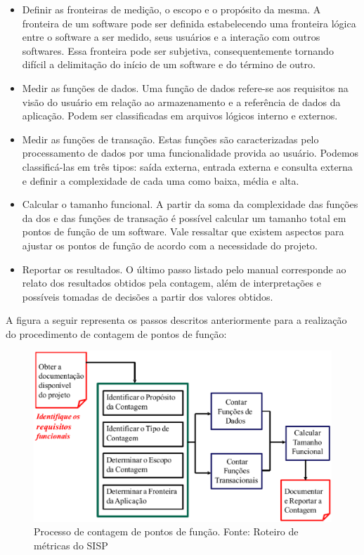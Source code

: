 \begin{itemize}

\item Definir as fronteiras de medição, o escopo e o propósito da mesma. A fronteira de um software pode ser definida estabelecendo uma fronteira lógica entre o software a ser medido, seus usuários e a interação com outros softwares. Essa fronteira pode ser subjetiva, consequentemente tornando difícil a delimitação do início de um software e do término de outro.

\item Medir as funções de dados. Uma função de dados refere-se aos requisitos na visão do usuário em relação ao armazenamento e a referência de dados da aplicação. Podem ser classificadas em arquivos lógicos interno e externos.

\item Medir as funções de transação. Estas funções são caracterizadas pelo processamento de dados por uma funcionalidade provida ao usuário. Podemos classificá-las em três tipos: saída externa, entrada externa e consulta externa e definir a complexidade de cada uma como baixa, média e alta.

\item Calcular o tamanho funcional. A partir da soma da complexidade das funções da dos e das funções de transação é possível calcular um tamanho total em pontos de função de um software. Vale ressaltar que existem aspectos para ajustar os pontos de função de acordo com a necessidade do projeto.

\item Reportar os resultados. O último passo listado pelo manual corresponde ao relato dos resultados obtidos pela contagem, além de interpretações e possíveis tomadas de decisões a partir dos valores obtidos.

\end{itemize}

A figura a seguir representa os passos descritos anteriormente para a realização do procedimento de contagem de pontos de função:

\begin{figure}[h]
	\centering
	\label{fig03}
		\includegraphics[keepaspectratio=true,scale=0.4]{figuras/fig03.eps}
	\caption{Processo de contagem de pontos de função. Fonte: Roteiro de métricas do SISP}
\end{figure}


